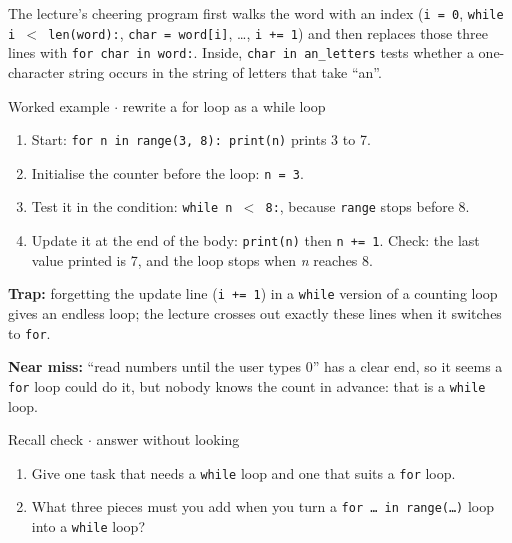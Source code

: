 \documentclass[11pt]{article}
\begin{document}
\begin{keepsection}
The lecture’s cheering program first walks the word with an index (\texttt{i = 0}, \texttt{while i \ensuremath{<} len(word):}, \texttt{char = word[i]}, …, \texttt{i += 1}) and then replaces those three lines with \texttt{for char in word:}. Inside, \texttt{char in an\_letters} tests whether a one-character string occurs in the string of letters that take “an”.

\begin{workedbox}{Worked example \ensuremath{\cdot} rewrite a for loop as a while loop}
\begin{enumerate}
\item Start: \texttt{for n in range(3, 8): print(n)} prints 3 to 7.
\item Initialise the counter before the loop: \texttt{n = 3}.
\item Test it in the condition: \texttt{while n \ensuremath{<} 8:}, because \texttt{range} stops before 8.
\item Update it at the end of the body: \texttt{print(n)} then \texttt{n += 1}. Check: the last value printed is 7, and the loop stops when \textit{n} reaches 8.
\end{enumerate}
\end{workedbox}

\begin{notebox}\textbf{Trap:} forgetting the update line (\texttt{i += 1}) in a \texttt{while} version of a counting loop gives an endless loop; the lecture crosses out exactly these lines when it switches to \texttt{for}.\end{notebox}

\begin{notebox}\textbf{Near miss:} “read numbers until the user types 0” has a clear end, so it seems a \texttt{for} loop could do it, but nobody knows the count in advance: that is a \texttt{while} loop.\end{notebox}

\begin{recallbox}{Recall check \ensuremath{\cdot} answer without looking}
\begin{enumerate}
\item Give one task that needs a \texttt{while} loop and one that suits a \texttt{for} loop.
\item What three pieces must you add when you turn a \texttt{for … in range(…)} loop into a \texttt{while} loop?
\end{enumerate}

\end{recallbox}
\end{keepsection}
\end{document}
